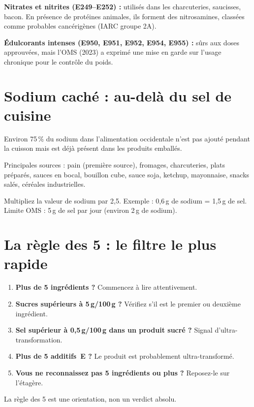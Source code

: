 \documentclass[a5paper,12pt,oneside,openany]{book}
\newcommand{\boxinfo}[2]{%
  \begin{tcolorbox}[boitebase,
    colback=bleuinfo!8!white, colframe=bleuinfo, title={#1}]
  #2\end{tcolorbox}}
\begin{document}
\textbf{Nitrates et nitrites (E249--E252) :} utilisés dans les charcuteries,
saucisses, bacon. En présence de protéines animales, ils forment des
nitrosamines, classées comme probables cancérigènes (IARC groupe 2A).

\textbf{Édulcorants intenses (E950, E951, E952, E954, E955) :} sûrs aux doses
approuvées, mais l'OMS (2023) a exprimé une mise en garde sur l'usage
chronique pour le contrôle du poids.

\section{Sodium caché : au-delà du sel de cuisine}

Environ 75\,\% du sodium dans l'alimentation occidentale n'est pas ajouté
pendant la cuisson mais est déjà présent dans les produits emballés.

Principales sources : pain (première source), fromages, charcuteries, plats
préparés, sauces en bocal, bouillon cube, sauce soja, ketchup, mayonnaise,
snacks salés, céréales industrielles.

\boxinfo{Conversion sodium--sel}{Multipliez la valeur de sodium par 2,5.
Exemple : 0,6\,g de sodium = 1,5\,g de sel. Limite OMS : 5\,g de sel par
jour (environ 2\,g de sodium).}

\section{La règle des 5 : le filtre le plus rapide}

\begin{enumerate}
  \item \textbf{Plus de 5 ingrédients ?} Commencez à lire attentivement.
  \item \textbf{Sucres supérieurs à 5\,g/100\,g ?} Vérifiez s'il est le premier
    ou deuxième ingrédient.
  \item \textbf{Sel supérieur à 0,5\,g/100\,g dans un produit sucré ?} Signal
    d'ultra-transformation.
  \item \textbf{Plus de 5 additifs~E ?} Le produit est probablement ultra-transformé.
  \item \textbf{Vous ne reconnaissez pas 5 ingrédients ou plus ?} Reposez-le
    sur l'étagère.
\end{enumerate}

\boxinfo{Note}{La règle des 5 est une orientation, non un verdict absolu.}

\end{document}
